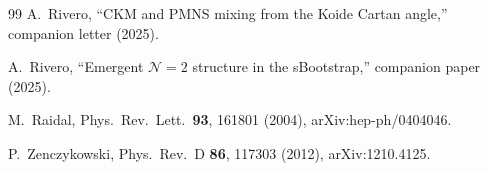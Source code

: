 \documentclass[aps,prd,twocolumn,showpacs,preprintnumbers,superscriptaddress,floatfix]{revtex4-2}
\begin{document}
\begin{thebibliography}{99}
  A.~Rivero,
  ``CKM and PMNS mixing from the Koide Cartan angle,''
  companion letter (2025).

  A.~Rivero,
  ``Emergent $\mathcal{N}{=}2$ structure in the sBootstrap,''
  companion paper (2025).

  M.~Raidal,
  Phys.\ Rev.\ Lett.\ \textbf{93}, 161801 (2004),
  arXiv:hep-ph/0404046.

  P.~Zenczykowski,
  Phys.\ Rev.\ D \textbf{86}, 117303 (2012),
  arXiv:1210.4125.

\end{thebibliography}
\end{document}
